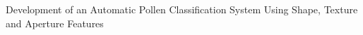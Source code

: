 Development of an Automatic Pollen Classification System Using Shape, Texture and Aperture Features
    